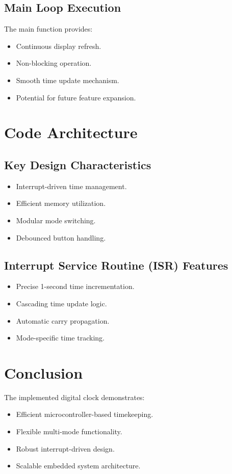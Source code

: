 \documentclass{article}
\begin{document}
\subsection{Main Loop Execution}
The main function provides:
\begin{itemize}
    \item Continuous display refresh.
    \item Non-blocking operation.
    \item Smooth time update mechanism.
    \item Potential for future feature expansion.
\end{itemize}

\section{Code Architecture}
\subsection{Key Design Characteristics}
\begin{itemize}
    \item Interrupt-driven time management.
    \item Efficient memory utilization.
    \item Modular mode switching.
    \item Debounced button handling.
\end{itemize}

\subsection{Interrupt Service Routine (ISR) Features}
\begin{itemize}
    \item Precise 1-second time incrementation.
    \item Cascading time update logic.
    \item Automatic carry propagation.
    \item Mode-specific time tracking.
\end{itemize}

\section{Conclusion}
The implemented digital clock demonstrates:
\begin{itemize}
    \item Efficient microcontroller-based timekeeping.
    \item Flexible multi-mode functionality.
    \item Robust interrupt-driven design.
    \item Scalable embedded system architecture.
\end{itemize}
\end{document}

